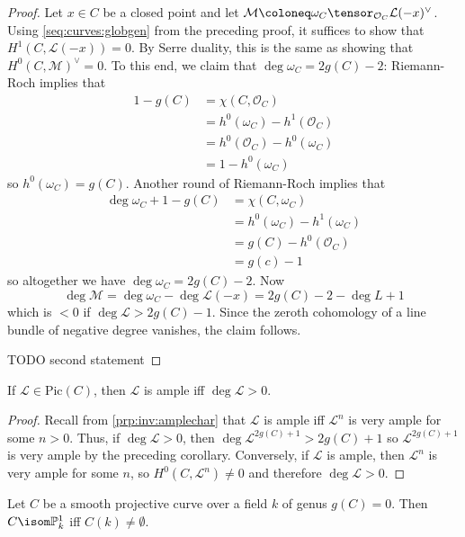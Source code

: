 \documentclass[wip, algebra]{bsteffan-lecturenotes}
\newcommand{\cO}{\mathcal{O}}
\newcommand{\cL}{\mathcal{L}}
\newcommand{\cM}{\mathcal{M}}
\renewcommand{\P}{\mathbb{P}}
\newcommand{\Pic}{\mathrm{Pic}}
\begin{document}
\begin{proof}
	Let $x \in C$ be a closed point and let $\cM \coloneq \omega_C \tensor_{\cO_C} \cL(-x)^\vee$.
	Using \cref{seq:curves:globgen} from the preceding proof, it suffices to show that $H^1(C, \cL(-x)) = 0$. 
	By Serre duality, this is the same as showing that $H^0(C, \cM)^\vee = 0$.
	To this end, we claim that $\deg \omega_C = 2 g(C) - 2$:
	Riemann-Roch implies that 
	\begin{align*}
		1 - g(C) & = \chi(C, \cO_C) \\
				 &= h^0(\omega_C) - h^1(\cO_C) \\
				 &= h^0(\cO_C) - h^0(\omega_C) \\
				 &= 1 - h^0(\omega_C)
	\end{align*}
	so $h^0(\omega_C) = g(C)$.
	Another round of Riemann-Roch implies that
	\begin{align*}
		\deg \omega_C + 1 - g(C) &= \chi(C, \omega_C) \\
								 &= h^0(\omega_C) - h^1(\omega_C) \\
								 &= g(C) - h^0(\cO_C) \\
								 &= g(c) - 1
	\end{align*}
	so altogether we have $\deg \omega_C = 2g(C) - 2$.
	Now
	\begin{equation*}
		\deg \cM = \deg \omega_C - \deg \cL(-x) = 2g(C) - 2 - \deg L + 1
	\end{equation*}
	which is $< 0$ if $\deg \cL > 2g(C) - 1$. 
	Since the zeroth cohomology of a line bundle of negative degree vanishes, the claim follows.

	TODO second statement
\end{proof}
\begin{corollary}
	If $\cL \in \Pic(C)$, then $\cL$ is ample iff $\deg \cL > 0$.
\end{corollary}
\begin{proof}
	Recall from \cref{prp:inv:amplechar} that $\cL$ is ample iff $\cL^n$ is very ample for some $n > 0$.
	Thus, if $\deg \cL > 0$, then $\deg \cL^{2g(C) + 1} > 2g(C) + 1$ so $\cL^{2g(C) + 1}$ is very ample by the preceding corollary.
	Conversely, if $\cL$ is ample, then $\cL^n$ is very ample for some $n$, so $H^0(C, \cL^n) \neq 0$ and therefore $\deg \cL > 0$.
\end{proof}
\begin{proposition}
	Let $C$ be a smooth projective curve over a field $k$ of genus $g(C) = 0$.
	Then $C \isom \P^1_k$ iff $C(k) \neq \emptyset$.
\end{proposition}
\end{document}
